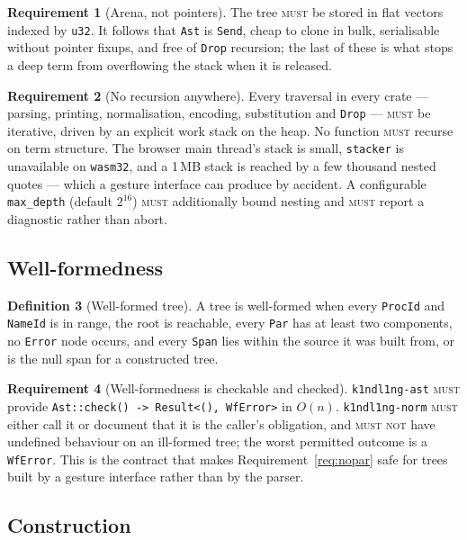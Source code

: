 \documentclass[11pt,a4paper]{article}
\newcommand{\code}[1]{\texttt{#1}}
\newcommand{\MUST}{\textsc{must}}
\newcommand{\MUSTNOT}{\textsc{must not}}
\theoremstyle{definition}
\newtheorem{definition}{Definition}[section]
\newtheorem{requirement}[definition]{Requirement}
\theoremstyle{plain}
\begin{document}
\begin{requirement}[Arena, not pointers]
The tree \MUST{} be stored in flat vectors indexed by \code{u32}. It follows
that \code{Ast} is \code{Send}, cheap to clone in bulk, serialisable without
pointer fixups, and free of \code{Drop} recursion; the last of these is what
stops a deep term from overflowing the stack when it is released.
\end{requirement}

\begin{requirement}[No recursion anywhere]\label{req:nonrec}
Every traversal in every crate --- parsing, printing, normalisation, encoding,
substitution and \code{Drop} --- \MUST{} be iterative, driven by an explicit work
stack on the heap. No function \MUST{} recurse on term structure. The browser
main thread's stack is small, \code{stacker} is unavailable on \code{wasm32},
and a 1\,MB stack is reached by a few thousand nested quotes --- which a gesture
interface can produce by accident. A configurable \code{max\_depth} (default
$2^{16}$) \MUST{} additionally bound nesting and \MUST{} report a diagnostic
rather than abort.
\end{requirement}

\subsection{Well-formedness}

\begin{definition}[Well-formed tree]\label{def:wf}
A tree is well-formed when every \code{ProcId} and \code{NameId} is in range,
the root is reachable, every \code{Par} has at least two components, no
\code{Error} node occurs, and every \code{Span} lies within the source it was
built from, or is the null span for a constructed tree.
\end{definition}

\begin{requirement}[Well-formedness is checkable and checked]
\code{k1ndl1ng-ast} \MUST{} provide \code{Ast::check() -> Result<(), WfError>}
in $O(n)$. \code{k1ndl1ng-norm} \MUST{} either call it or document that it is
the caller's obligation, and \MUSTNOT{} have undefined behaviour on an
ill-formed tree; the worst permitted outcome is a \code{WfError}. This is the
contract that makes Requirement~\ref{req:nopar} safe for trees built by a
gesture interface rather than by the parser.
\end{requirement}

\subsection{Construction}
\end{document}

